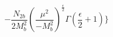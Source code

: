\begin{equation}
-\frac{N_{2b}}{2M_{b}^{2}}\left(\frac{\mu^{2}}{-M_{b}^{2}}\right)^{\frac{\epsilon}{2}}
\Gamma(\frac{\epsilon}{2}+1)\biggr\}
\end{equation}

